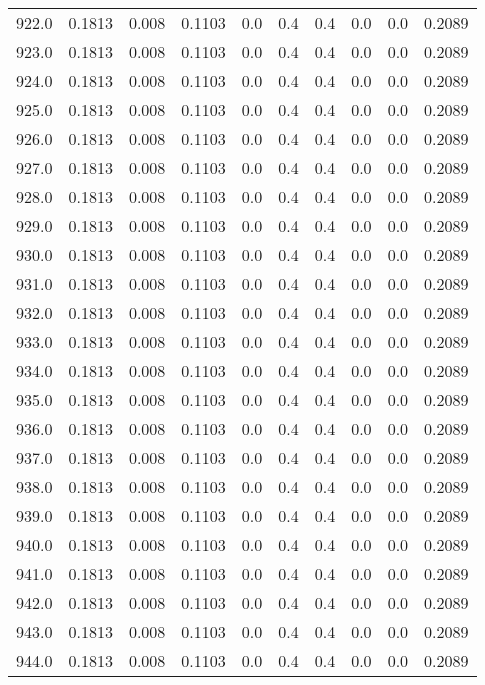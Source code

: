 \begin{longtable}{lrrrrrrrrr}
922.0 & 0.1813 & 0.008 & 0.1103 & 0.0 & 0.4 & 0.4 & 0.0 & 0.0 & 0.2089 \\
923.0 & 0.1813 & 0.008 & 0.1103 & 0.0 & 0.4 & 0.4 & 0.0 & 0.0 & 0.2089 \\
924.0 & 0.1813 & 0.008 & 0.1103 & 0.0 & 0.4 & 0.4 & 0.0 & 0.0 & 0.2089 \\
925.0 & 0.1813 & 0.008 & 0.1103 & 0.0 & 0.4 & 0.4 & 0.0 & 0.0 & 0.2089 \\
926.0 & 0.1813 & 0.008 & 0.1103 & 0.0 & 0.4 & 0.4 & 0.0 & 0.0 & 0.2089 \\
927.0 & 0.1813 & 0.008 & 0.1103 & 0.0 & 0.4 & 0.4 & 0.0 & 0.0 & 0.2089 \\
928.0 & 0.1813 & 0.008 & 0.1103 & 0.0 & 0.4 & 0.4 & 0.0 & 0.0 & 0.2089 \\
929.0 & 0.1813 & 0.008 & 0.1103 & 0.0 & 0.4 & 0.4 & 0.0 & 0.0 & 0.2089 \\
930.0 & 0.1813 & 0.008 & 0.1103 & 0.0 & 0.4 & 0.4 & 0.0 & 0.0 & 0.2089 \\
931.0 & 0.1813 & 0.008 & 0.1103 & 0.0 & 0.4 & 0.4 & 0.0 & 0.0 & 0.2089 \\
932.0 & 0.1813 & 0.008 & 0.1103 & 0.0 & 0.4 & 0.4 & 0.0 & 0.0 & 0.2089 \\
933.0 & 0.1813 & 0.008 & 0.1103 & 0.0 & 0.4 & 0.4 & 0.0 & 0.0 & 0.2089 \\
934.0 & 0.1813 & 0.008 & 0.1103 & 0.0 & 0.4 & 0.4 & 0.0 & 0.0 & 0.2089 \\
935.0 & 0.1813 & 0.008 & 0.1103 & 0.0 & 0.4 & 0.4 & 0.0 & 0.0 & 0.2089 \\
936.0 & 0.1813 & 0.008 & 0.1103 & 0.0 & 0.4 & 0.4 & 0.0 & 0.0 & 0.2089 \\
937.0 & 0.1813 & 0.008 & 0.1103 & 0.0 & 0.4 & 0.4 & 0.0 & 0.0 & 0.2089 \\
938.0 & 0.1813 & 0.008 & 0.1103 & 0.0 & 0.4 & 0.4 & 0.0 & 0.0 & 0.2089 \\
939.0 & 0.1813 & 0.008 & 0.1103 & 0.0 & 0.4 & 0.4 & 0.0 & 0.0 & 0.2089 \\
940.0 & 0.1813 & 0.008 & 0.1103 & 0.0 & 0.4 & 0.4 & 0.0 & 0.0 & 0.2089 \\
941.0 & 0.1813 & 0.008 & 0.1103 & 0.0 & 0.4 & 0.4 & 0.0 & 0.0 & 0.2089 \\
942.0 & 0.1813 & 0.008 & 0.1103 & 0.0 & 0.4 & 0.4 & 0.0 & 0.0 & 0.2089 \\
943.0 & 0.1813 & 0.008 & 0.1103 & 0.0 & 0.4 & 0.4 & 0.0 & 0.0 & 0.2089 \\
944.0 & 0.1813 & 0.008 & 0.1103 & 0.0 & 0.4 & 0.4 & 0.0 & 0.0 & 0.2089 \\

\end{longtable}
